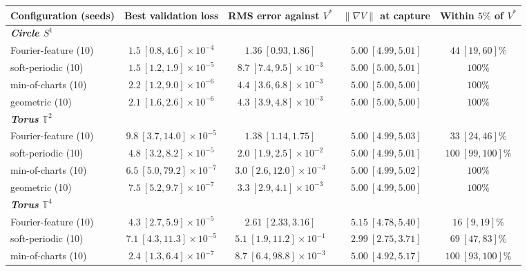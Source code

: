 \begin{table}[!tbp]
\centering
\scriptsize
\setlength{\tabcolsep}{3.5pt}
\begin{tabular}{lcccc}
\toprule
Configuration (seeds) & Best validation loss & RMS error against $V^{*}$ & $\|\nabla V\|$ at capture & Within $5\%$ of $V^{*}$ \\
\midrule
\multicolumn{5}{l}{\emph{\textbf{Circle $S^{1}$}}} \\
Fourier-feature (10) & $1.5\ [0.8,4.6]\times10^{-4}$ & $1.36\ [0.93,1.86]$ & $5.00\ [4.99,5.01]$ & $44\ [19,60]\%$ \\
soft-periodic (10) & $1.5\ [1.2,1.9]\times10^{-5}$ & $8.7\ [7.4,9.5]\times10^{-3}$ & $5.00\ [5.00,5.01]$ & $100\%$ \\
min-of-charts (10) & $2.2\ [1.2,9.0]\times10^{-6}$ & $4.4\ [3.6,6.8]\times10^{-3}$ & $5.00\ [5.00,5.00]$ & $100\%$ \\
geometric (10) & $2.1\ [1.6,2.6]\times10^{-6}$ & $4.3\ [3.9,4.8]\times10^{-3}$ & $5.00\ [5.00,5.00]$ & $100\%$ \\
\midrule
\multicolumn{5}{l}{\emph{\textbf{Torus $\mathbb{T}^{2}$}}} \\
Fourier-feature (10) & $9.8\ [3.7,14.0]\times10^{-5}$ & $1.38\ [1.14,1.75]$ & $5.00\ [4.99,5.03]$ & $33\ [24,46]\%$ \\
soft-periodic (10) & $4.8\ [3.2,8.2]\times10^{-5}$ & $2.0\ [1.9,2.5]\times10^{-2}$ & $5.00\ [4.99,5.01]$ & $100\ [99,100]\%$ \\
min-of-charts (10) & $6.5\ [5.0,79.2]\times10^{-7}$ & $3.0\ [2.6,12.0]\times10^{-3}$ & $5.00\ [4.99,5.02]$ & $100\%$ \\
geometric (10) & $7.5\ [5.2,9.7]\times10^{-7}$ & $3.3\ [2.9,4.1]\times10^{-3}$ & $5.00\ [4.99,5.00]$ & $100\%$ \\
\midrule
\multicolumn{5}{l}{\emph{\textbf{Torus $\mathbb{T}^{4}$}}} \\
Fourier-feature (10) & $4.3\ [2.7,5.9]\times10^{-5}$ & $2.61\ [2.33,3.16]$ & $5.15\ [4.78,5.40]$ & $16\ [9,19]\%$ \\
soft-periodic (10) & $7.1\ [4.3,11.3]\times10^{-5}$ & $5.1\ [1.9,11.2]\times10^{-1}$ & $2.99\ [2.75,3.71]$ & $69\ [47,83]\%$ \\
min-of-charts (10) & $2.4\ [1.3,6.4]\times10^{-7}$ & $8.7\ [6.4,98.8]\times10^{-3}$ & $5.00\ [4.92,5.17]$ & $100\ [93,100]\%$ \\

\end{tabular}
\end{table}
